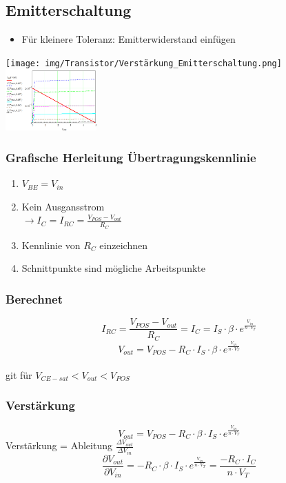 \documentclass[margin=normal]{tex/hsrzf}
\begin{document}
\begin{minipage}{0.49\textwidth}

  \subsection{Emitterschaltung}
  \begin{itemize}[leftmargin=*]
    \item Für kleinere Toleranz: Emitterwiderstand einfügen
  \end{itemize}
  \texttt{[image: img/Transistor/Verstärkung\_Emitterschaltung.png]}
  \includegraphics[width = 3.5cm]{img/Transistor/Uebertragungskennlinie.png}
  \subsubsection*{Grafische Herleitung Übertragungskennlinie}
  \begin{enumerate}
    \item $V_{BE} = V_{in}$
    \item Kein Ausgansstrom
          \\ $\rightarrow I_C = I_{RC} = \frac{V_{POS} - V_{out}}{R_C}$
    \item Kennlinie von $R_C$ einzeichnen
    \item Schnittpunkte sind mögliche Arbeitspunkte
  \end{enumerate}
  \subsubsection*{Berechnet}
  $$I_{RC} = \frac{V_{POS} - V_{out}}{R_C} = I_C = I_S \cdot \beta \cdot e^{\frac{V_{in}}{n \cdot V_T}}$$
  $$V_{out} = V_{POS}-R_C \cdot  I_S \cdot \beta \cdot e^{\frac{V_{in}}{n \cdot V_T}}$$
  {\\ \tiny git für $V_{CE-sat} < V_{out} < V_{POS}$}
  \subsubsection*{Verstärkung}
  $$V_{out} = V_{POS} - R_C \cdot \beta \cdot I_S \cdot e^{\frac{V_{in}}{n \cdot V_T}}$$
  Verstärkung = Ableitung $\frac{\Delta V_{out}}{\Delta V_{in}}$
  $$\frac{\partial V_{out}}{\partial V_{in}} =- R_C \cdot \beta \cdot I_S \cdot e^{\frac{V_{in}}{n \cdot V_T}} = \frac{-R_C \cdot I_C}{n \cdot V_T} $$
\end{minipage}%
\end{document}
